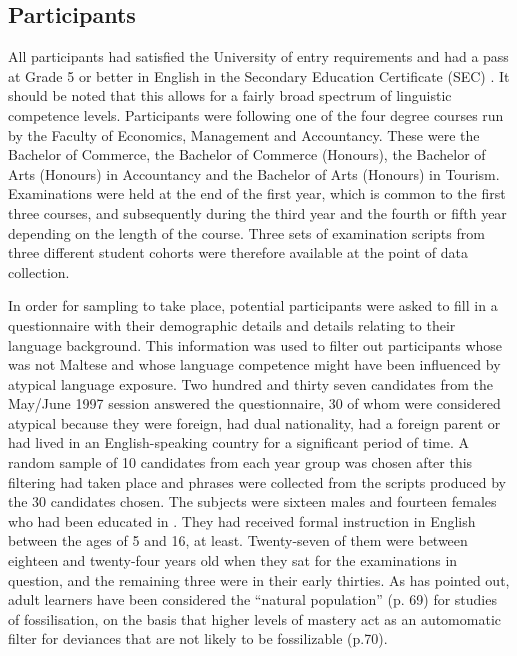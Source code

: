 \documentclass[output=paper]{langsci/langscibook}
\begin{document}
\subsection{Participants}
\largerpage
All participants had satisfied the University of  entry
requirements and had a pass at Grade 5 or better in English in the
Secondary Education Certificate (SEC) \citep{GER2010}. It should be noted that this allows for a fairly broad spectrum
of linguistic competence levels. Participants were following one of
the four degree courses run by the Faculty of Economics, Management
and Accountancy. These were the Bachelor of Commerce, the Bachelor of
Commerce (Honours), the Bachelor of Arts (Honours) in Accountancy and
the Bachelor of Arts (Honours) in Tourism. Examinations were held at
the end of the first year, which is common to the first three courses, and
subsequently during the third year and the fourth or fifth year
depending on the length of the course. Three sets of examination
scripts from three different student cohorts were therefore available
at the point of data collection.



In order for sampling to take place, potential participants were asked
to fill in a questionnaire with their demographic details and details
relating to their language background. This information was used to
filter out participants whose  was not Maltese and
whose language competence might have been influenced by atypical
language exposure. Two hundred and thirty seven candidates from the
May/June 1997 session answered the questionnaire, 30 of whom were
considered atypical because they were foreign, had dual nationality,
had a foreign parent or had lived in an English-speaking country for a
significant period of time. A random sample of 10 candidates from
each year group was chosen after this filtering had taken place and
 phrases were collected from the scripts produced by the 
30 candidates chosen. The subjects were sixteen males and fourteen
females who had been educated in . They had received formal
instruction in English 
between the ages of 5 and 16, at least.
Twenty-seven of them were between eighteen and twenty-four
years old when they sat for the examinations in question, and the
remaining three were in their early thirties. As
\citet{Hyltenstam1988} has pointed out, adult learners have been
considered the “natural population” (p. 69) for studies of
fossilisation, on the basis that higher levels of mastery act as an
automomatic filter for deviances that are not likely to be
fossilizable (p.70).
\end{document}
